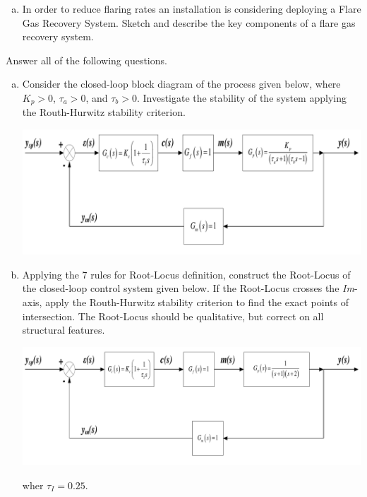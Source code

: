 \documentclass[calculator,datasheet,resit]{exam}
\begin{document}
\begin{question}
\begin{enumerate}[(a)]
\item In order to reduce flaring rates an installation is considering deploying a Flare Gas Recovery System. Sketch and describe the key components of a flare gas recovery system.~


%
\end{enumerate}

\end{question}

\clearpage

\begin{question}
Answer all of the following questions.

\begin{enumerate}[(a)]
\item Consider the closed-loop block diagram of the process given below, where $K_{p} > 0$, $\tau_{a} > 0$, and $\tau_{b} > 0$. Investigate the stability of the system applying the Routh-Hurwitz stability criterion.~
\begin{center}
\includegraphics[width=\columnwidth]{./Pics/EG5597_Control_1_June_2014-5.pdf}
\end{center} 

\item Applying the 7 rules for Root-Locus definition, construct the Root-Locus of the closed-loop control system given below. If the Root-Locus crosses the {\it Im}-axis, apply the Routh-Hurwitz stability criterion to find the exact points of intersection. The Root-Locus should be qualitative, but correct on all structural features.~
\begin{center}
\includegraphics[width=\columnwidth]{./Pics/EG5597_Control_2_June_2014-5.pdf}
\end{center} 
wher $\tau_{I}=0.25$.


\end{enumerate}
\end{question}
\end{document}
